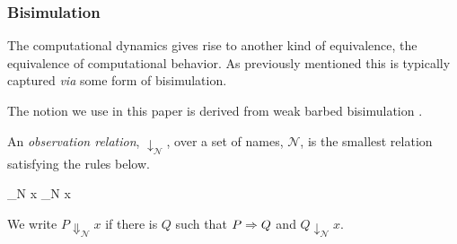 




\subsubsection{Bisimulation}

The computational dynamics gives rise to another kind of equivalence,
the equivalence of computational behavior. As previously mentioned
this is typically captured \emph{via} some form of bisimulation.


The notion we use in this paper is derived from weak barbed
bisimulation \cite{milner91polyadicpi}. 

\begin{definition}
An \emph{observation relation}, $\downarrow_{\mathcal N}$, over a set
of names, $\mathcal N$, is the smallest relation satisfying the rules
below.

		  { \downarrow_{\mathcal N} x}
		  { \downarrow_{\mathcal N} x}

We write $P \Downarrow_{\mathcal N} x$ if there is $Q$ such that 
$P \Rightarrow Q$ and $Q \downarrow_{\mathcal N} x$.
\end{definition}

